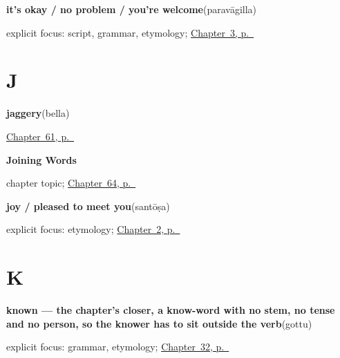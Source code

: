 \noindent\begin{minipage}[t]{\linewidth}
\raggedright
\textbf{it's okay / no problem / you're welcome}\enspace\emph{}\enspace(paravāgilla)\par
\footnotesize explicit focus: script, grammar, etymology; \hyperref[ch:responding]{Chapter~3, p.~\pageref*{ch:responding}}
\end{minipage}\par\smallskip

\section*{J}

\noindent\begin{minipage}[t]{\linewidth}
\raggedright
\textbf{jaggery}\enspace\emph{}\enspace(bella)\par
\footnotesize \hyperref[ch:ka-kitchen]{Chapter~61, p.~\pageref*{ch:ka-kitchen}}
\end{minipage}\par\smallskip

\noindent\begin{minipage}[t]{\linewidth}
\raggedright
\textbf{Joining Words}\par
\footnotesize chapter topic; \hyperref[ch:ka-joining]{Chapter~64, p.~\pageref*{ch:ka-joining}}
\end{minipage}\par\smallskip

\noindent\begin{minipage}[t]{\linewidth}
\raggedright
\textbf{joy / pleased to meet you}\enspace\emph{}\enspace(santōṣa)\par
\footnotesize explicit focus: etymology; \hyperref[ch:introductions]{Chapter~2, p.~\pageref*{ch:introductions}}
\end{minipage}\par\smallskip

\section*{K}

\noindent\begin{minipage}[t]{\linewidth}
\raggedright
\textbf{known — the chapter's closer, a know-word with no stem, no tense and no person, so the knower has to sit outside the verb}\enspace\emph{}\enspace(gottu)\par
\footnotesize explicit focus: grammar, etymology; \hyperref[ch:ka-core-verbs]{Chapter~32, p.~\pageref*{ch:ka-core-verbs}}
\end{minipage}\par\smallskip


